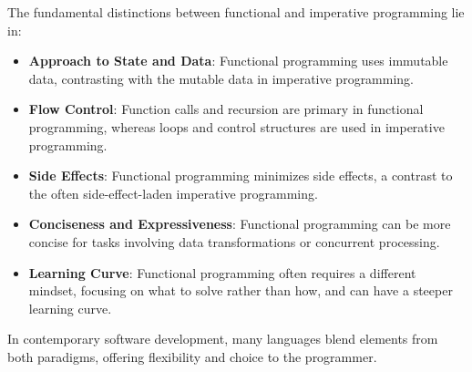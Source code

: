 The fundamental distinctions between functional and imperative programming lie in:

\begin{itemize}
	\item \textbf{Approach to State and Data}: Functional programming uses immutable data, contrasting with the mutable data in imperative programming.
	\item \textbf{Flow Control}: Function calls and recursion are primary in functional programming, whereas loops and control structures are used in imperative programming.
	\item \textbf{Side Effects}: Functional programming minimizes side effects, a contrast to the often side-effect-laden imperative programming.
	\item \textbf{Conciseness and Expressiveness}: Functional programming can be more concise for tasks involving data transformations or concurrent processing.
	\item \textbf{Learning Curve}: Functional programming often requires a different mindset, focusing on what to solve rather than how, and can have a steeper learning curve.
\end{itemize}

In contemporary software development, many languages blend elements from both paradigms, offering flexibility and choice to the programmer.